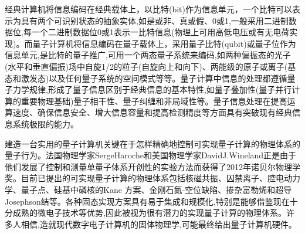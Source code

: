 经典计算机将信息编码在经典载体上，以比特(bit)作为信息单元，一个比特可以表示为具有两个可识别状态的抽象实体,如是或非、真或假、0或1,一般采用二进制数据位,每一个二进制数据位0或1表示一比特信息(物理上可用高低电压或有无电荷实现)。而量子计算机将信息编码在量子载体上，采用量子比特(qubit)或量子位作为信息单元,是比特的量子推广,可用一个两态量子系统来编码,如两种偏振态的光子(水平和垂直偏振)场中自旋1/2的粒子(自旋向上和向下)、两能级的原子或离子(基态和激发态)以及任何量子系统的空间模式等等。量子计算中信息的处理都遵循量子力学规律,形成了量子信息区别于经典信息的基本特性,如量子叠加性(量子并行计算的重要物理基础)量子相干性、量子纠缠和非局域性等。量子信息处理在提高运算速度、确保信息安全、增大信息容量和提高检测精度等方面具有突破现有经典信息系统极限的能力。

建造一台实用的量子计算机关键在于怎样精确地控制可实现量子计算的物理体系的量子行为。法国物理学家SergeHaroche和美国物理学家DavidJ.Wineland正是由于他们发展了控制和测量单量子体系开创性的实验方法而获得了2012年诺贝尔物理学奖。目前已提出的可实现量子计算的物理体系包括核磁共振、囚禁离子、腔电动力学、量子点、硅基中磷核的Kane 方案、金刚石氮-空位缺陷、掺杂富勒烯和超导 Josephson结等。各种固态实现方案具有易于集成和规模化,特别是能够借鉴现在十分成熟的微电子技术等优势,因此被视为很有潜力的实现量子计算的物理体系。许多人相信,造就现代数字电子计算机的固体物理学,可能最终给出量子计算机硬件。
